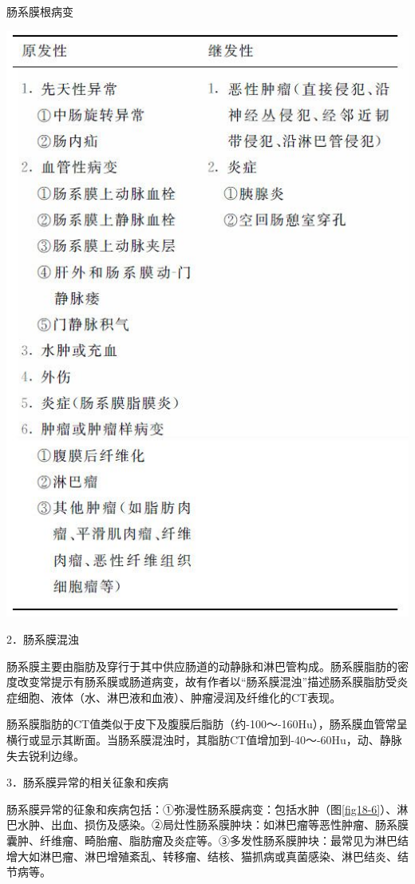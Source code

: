 \begin{table}[htbp]
\centering
\caption{肠系膜根病变}
\label{tab18-1}
\includegraphics[width=\textwidth,height=\textheight,keepaspectratio]{./images/Image00375.jpg}
\end{table}

2．肠系膜混浊

肠系膜主要由脂肪及穿行于其中供应肠道的动静脉和淋巴管构成。肠系膜脂肪的密度改变常提示有肠系膜或肠道病变，故有作者以“肠系膜混浊”描述肠系膜脂肪受炎症细胞、液体（水、淋巴液和血液）、肿瘤浸润及纤维化的CT表现。

肠系膜脂肪的CT值类似于皮下及腹膜后脂肪（约-100～-160Hu），肠系膜血管常呈横行或显示其断面。当肠系膜混浊时，其脂肪CT值增加到-40～-60Hu，动、静脉失去锐利边缘。

3．肠系膜异常的相关征象和疾病

肠系膜异常的征象和疾病包括：①弥漫性肠系膜病变：包括水肿（图\ref{fig18-6}）、淋巴水肿、出血、损伤及感染。②局灶性肠系膜肿块：如淋巴瘤等恶性肿瘤、肠系膜囊肿、纤维瘤、畸胎瘤、脂肪瘤及炎症等。③多发性肠系膜肿块：最常见为淋巴结增大如淋巴瘤、淋巴增殖紊乱、转移瘤、结核、猫抓病或真菌感染、淋巴结炎、结节病等。

